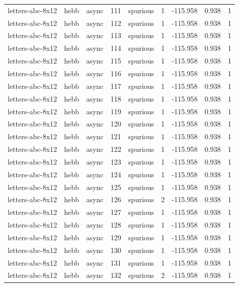 \begin{tabular}{lllrlrrrr}
letters-abc-8x12 & hebb & async & 111 & spurious & 1 & -115.958 & 0.938 & 1 \\
letters-abc-8x12 & hebb & async & 112 & spurious & 1 & -115.958 & 0.938 & 1 \\
letters-abc-8x12 & hebb & async & 113 & spurious & 1 & -115.958 & 0.938 & 1 \\
letters-abc-8x12 & hebb & async & 114 & spurious & 1 & -115.958 & 0.938 & 1 \\
letters-abc-8x12 & hebb & async & 115 & spurious & 1 & -115.958 & 0.938 & 1 \\
letters-abc-8x12 & hebb & async & 116 & spurious & 1 & -115.958 & 0.938 & 1 \\
letters-abc-8x12 & hebb & async & 117 & spurious & 1 & -115.958 & 0.938 & 1 \\
letters-abc-8x12 & hebb & async & 118 & spurious & 1 & -115.958 & 0.938 & 1 \\
letters-abc-8x12 & hebb & async & 119 & spurious & 1 & -115.958 & 0.938 & 1 \\
letters-abc-8x12 & hebb & async & 120 & spurious & 1 & -115.958 & 0.938 & 1 \\
letters-abc-8x12 & hebb & async & 121 & spurious & 1 & -115.958 & 0.938 & 1 \\
letters-abc-8x12 & hebb & async & 122 & spurious & 1 & -115.958 & 0.938 & 1 \\
letters-abc-8x12 & hebb & async & 123 & spurious & 1 & -115.958 & 0.938 & 1 \\
letters-abc-8x12 & hebb & async & 124 & spurious & 1 & -115.958 & 0.938 & 1 \\
letters-abc-8x12 & hebb & async & 125 & spurious & 1 & -115.958 & 0.938 & 1 \\
letters-abc-8x12 & hebb & async & 126 & spurious & 2 & -115.958 & 0.938 & 1 \\
letters-abc-8x12 & hebb & async & 127 & spurious & 1 & -115.958 & 0.938 & 1 \\
letters-abc-8x12 & hebb & async & 128 & spurious & 1 & -115.958 & 0.938 & 1 \\
letters-abc-8x12 & hebb & async & 129 & spurious & 1 & -115.958 & 0.938 & 1 \\
letters-abc-8x12 & hebb & async & 130 & spurious & 1 & -115.958 & 0.938 & 1 \\
letters-abc-8x12 & hebb & async & 131 & spurious & 1 & -115.958 & 0.938 & 1 \\
letters-abc-8x12 & hebb & async & 132 & spurious & 2 & -115.958 & 0.938 & 1 \\

\end{tabular}
